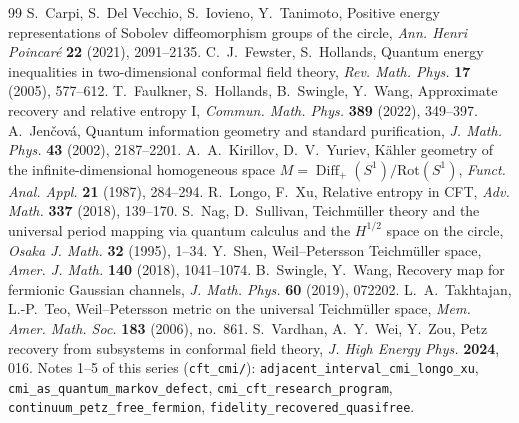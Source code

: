 \documentclass[11pt]{article}
\theoremstyle{accent}
\theoremstyle{definition}
\newcommand{\Diff}{\operatorname{Diff}}
\begin{document}
\begin{thebibliography}{99}
 S.~Carpi, S.~Del Vecchio, S.~Iovieno, Y.~Tanimoto, Positive energy representations of Sobolev diffeomorphism groups of the circle, \emph{Ann. Henri Poincar\'e} \textbf{22} (2021), 2091--2135.
 C.~J.~Fewster, S.~Hollands, Quantum energy inequalities in two-dimensional conformal field theory, \emph{Rev. Math. Phys.} \textbf{17} (2005), 577--612.
 T.~Faulkner, S.~Hollands, B.~Swingle, Y.~Wang, Approximate recovery and relative entropy I, \emph{Commun. Math. Phys.} \textbf{389} (2022), 349--397.
 A.~Jen\v cov\'a, Quantum information geometry and standard purification, \emph{J. Math. Phys.} \textbf{43} (2002), 2187--2201.
 A.~A.~Kirillov, D.~V.~Yuriev, K\"ahler geometry of the infinite-dimensional homogeneous space \(M=\Diff_+(S^1)/\mathrm{Rot}(S^1)\), \emph{Funct. Anal. Appl.} \textbf{21} (1987), 284--294.
 R.~Longo, F.~Xu, Relative entropy in CFT, \emph{Adv. Math.} \textbf{337} (2018), 139--170.
 S.~Nag, D.~Sullivan, Teichm\"uller theory and the universal period mapping via quantum calculus and the \(H^{1/2}\) space on the circle, \emph{Osaka J. Math.} \textbf{32} (1995), 1--34.
 Y.~Shen, Weil--Petersson Teichm\"uller space, \emph{Amer. J. Math.} \textbf{140} (2018), 1041--1074.
 B.~Swingle, Y.~Wang, Recovery map for fermionic Gaussian channels, \emph{J. Math. Phys.} \textbf{60} (2019), 072202.
 L.~A.~Takhtajan, L.-P.~Teo, Weil--Petersson metric on the universal Teichm\"uller space, \emph{Mem. Amer. Math. Soc.} \textbf{183} (2006), no.~861.
 S.~Vardhan, A.~Y.~Wei, Y.~Zou, Petz recovery from subsystems in conformal field theory, \emph{J. High Energy Phys.} \textbf{2024}, 016.
 Notes 1--5 of this series (\texttt{cft\_cmi/}): \texttt{adjacent\_interval\_cmi\_longo\_xu}, \texttt{cmi\_as\_quantum\_markov\_defect}, \texttt{cmi\_cft\_research\_program}, \texttt{continuum\_petz\_free\_fermion}, \texttt{fidelity\_recovered\_quasifree}.
\end{thebibliography}
\end{document}
